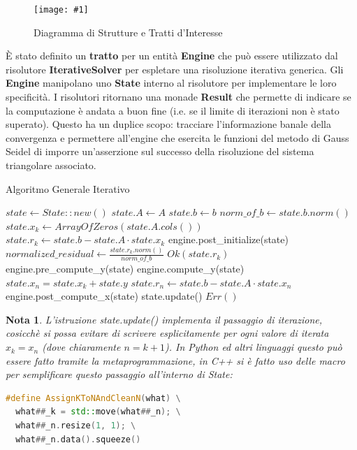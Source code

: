 \documentclass[a4paper,11pt,oneside, table]{article}
\newtheorem{nota}{Nota}
\newcommand{\putimage}[4] {
	\begin{figure}[H]
	    \centering
	    \texttt{[image: \#1]}
	    \caption{#2}\label{#3}
	\end{figure}
}
\begin{document}
\putimage{images/diagram.png}{Diagramma di Strutture e Tratti d'Interesse}{png:diagram_of_structures}{0.99}

\`E stato definito un \textbf{tratto} per un entit\`a \textbf{Engine} che pu\`o essere utilizzato dal risolutore \textbf{IterativeSolver} per espletare una risoluzione iterativa generica. Gli \textbf{Engine} manipolano uno \textbf{State} interno al risolutore per implementare le loro specificit\`a. I risolutori ritornano una monade \textbf{Result} che permette di indicare se la computazione \`e andata a buon fine (i.e. se il limite di iterazioni non \`e stato superato). Questo ha un duplice scopo: tracciare l'informazione banale della convergenza e permettere all'engine che esercita le funzioni del metodo di Gauss Seidel di imporre un'asserzione sul successo della risoluzione del sistema triangolare associato.

\begin{algorithm}
  \renewcommand\thealgorithm{}
  \caption{Algoritmo Generale Iterativo}
  \begin{algorithmic}
      \State $state \gets State::new()$
      \State $state.A \gets A$
      \State $state.b \gets b$
      \State $norm\_of\_b \gets state.b.norm()$
      \State $state.x_k \gets ArrayOfZeros(state.A.cols())$
      \State $state.r_k \gets state.b - state.A \cdot state.x_k$
      \State engine.post\_initialize(state)
        \State $normalized\_residual \gets \frac {state.r_k.norm()} {norm\_of\_b}$
          \State \Return $Ok(state.r_k)$
        \EndIf
        \State engine.pre\_compute\_y(state)
        \State engine.compute\_y(state)
        \State $state.x_n = state.x_k + state.y$
        \State $state.r_n \gets state.b - state.A \cdot state.x_n$
        \State engine.post\_compute\_x(state)
        \State state.update()
      \EndFor
      \State \Return $Err()$
    \EndProcedure
  \end{algorithmic}
\end{algorithm}

\begin{nota}
L'istruzione \textit{state.update()} implementa il passaggio di iterazione, cosicch\`e si possa evitare di scrivere esplicitamente per ogni valore di iterata $x_k = x_n$ (dove chiaramente $n = k+1$). In Python ed altri linguaggi questo pu\`o essere fatto tramite la metaprogrammazione, in C++ si \`e fatto uso delle macro per semplificare questo passaggio all'interno di \textit{State}:

\begin{lstlisting}[language=C++]
#define AssignKToNAndCleanN(what) \
  what##_k = std::move(what##_n); \
  what##_n.resize(1, 1); \
  what##_n.data().squeeze()
\end{lstlisting}
\end{nota}
\end{document}

